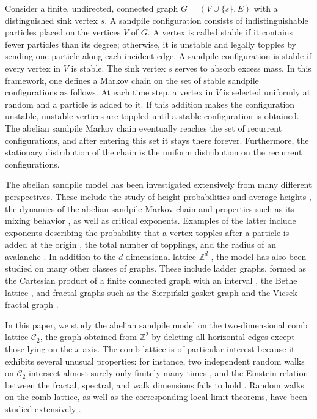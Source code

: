 \documentclass[11pt]{article}
\begin{document}
Consider a finite, undirected, connected graph $G=(V\cup\{s\},E)$ with a distinguished sink vertex $s$. A sandpile configuration consists of indistinguishable particles placed on the vertices $V$ of $G$. A vertex is called stable if it contains fewer particles than its degree; otherwise, it is unstable and legally topples by sending one particle along each incident edge. A sandpile configuration is stable if every vertex in $V$ is stable. The sink vertex $s$ serves to absorb excess mass. In this framework, one defines a Markov chain on the set of stable sandpile configurations as follows. At each time step, a vertex in $V$ is selected uniformly at random and a particle is added to it. If this addition makes the configuration unstable, unstable vertices are toppled until a stable configuration is obtained. The abelian sandpile Markov chain eventually reaches the set of recurrent configurations, and after entering this set it stays there forever. Furthermore, the stationary distribution of the chain is the uniform distribution on the recurrent configurations. 

The abelian sandpile model has been investigated extensively from many different perspectives. These include the study of height probabilities and average heights \cite{P94,JPR06,PPR11}, the dynamics of the abelian sandpile Markov chain and properties such as its mixing behavior \cite{JLP19,HJL19}, as well as critical exponents. Examples of the latter include exponents describing the probability that a vertex topples after a particle is added at the origin \cite{JRS15}, the total number of topplings, and the radius of an avalanche \cite{BHJ17,H20}.
In addition to the $d$-dimensional lattice $\mathbb{Z}^d$ \cite{LP09,FLP10}, the model has also been studied on many other classes of graphs. These include ladder graphs, formed as the Cartesian product of a finite connected graph with an interval \cite{JL07}, the Bethe lattice \cite{DM90,MRS02}, and fractal graphs such as the Sierpiński gasket graph \cite{CK20,KSW24,HKS25} and the Vicsek fractal graph \cite{HKS25_vic}.

In this paper, we study the abelian sandpile model on the two-dimensional comb lattice $\mathcal{C}_2$, the graph obtained from $\mathbb{Z}^2$ by deleting all horizontal edges except those lying on the $x$-axis. The comb lattice is of particular interest because it exhibits several unusual properties: for instance, two independent random walks on $\mathcal{C}_2$ intersect almost surely only finitely many times \cite{KP04}, and the Einstein relation between the fractal, spectral, and walk dimensions fails to hold \cite{B06}. Random walks on the comb lattice, as well as the corresponding local limit theorems, have been studied extensively \cite{G86,WH86,CD92,CCFR09}.
\end{document}
